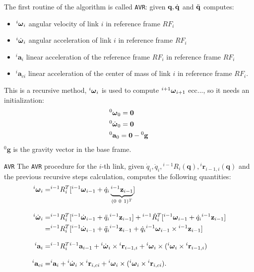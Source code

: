 \documentclass[10pt, a4paper]{report}
\newcommand{\q}{{\mathbf q}}
\begin{document}
\noindent The first routine of the algorithm is called \texttt{AVR}: given $\q,\dq$ and ${\ddot{\mathbf q}}$ computes:\begin{itemize}
    \item ${}^i{\boldsymbol{\omega}}_i$ angular velocity of link $i$ in reference frame $RF_i$
    \item ${}^i\dot{{\boldsymbol{\omega}}}_i$ angular acceleration of link $i$ in reference frame $RF_i$
    \item ${}^i\mathbf a_{i}$ linear acceleration of the  reference frame $RF_i$ in reference frame $RF_i$ 
    \item ${}^i\mathbf a_{ci}$ linear acceleration of the center of mass of link $i$ in reference frame $RF_i$.
\end{itemize}
This is a recursive method, ${}^i{\boldsymbol{\omega}}_i$ is used to compute ${}^{i+1}{\boldsymbol{\omega}}_{i+1}$ ecc..., so it needs an initialization:\begin{align}
    &{}^0{\boldsymbol{\omega}}_0=\mathbf 0\\
    &{}^0\dot{{\boldsymbol{\omega}}}_0=\mathbf 0\\
    &{}^0\mathbf a_{0}=\mathbf 0- {}^0\mathbf g
\end{align}
${}^0\mathbf g$ is the gravity vector in the base frame.
\begin{boxlemma}{\texttt{AVR}}{}
    The \texttt{AVR} procedure for the $i$-th link, given $\dot q_i,\ddot q_i, {}^{i-1}R_i(\q),{}^i\mathbf r_{i-1,i}(\q)$ and the previous recursive steps calculation, computes the following quantities:\begin{align}
        {}^i{\boldsymbol{\omega}}_i=&{}^{i-1}R_i^T[{}^{i-1}{\boldsymbol{\omega}}_{i-1}+\dot q_i \underbrace{{}^{i-1}\mathbf z_{i-1}}_{(0 \ 0 \ 1)^T}]\\[2ex]
        {}^i\dot{{\boldsymbol{\omega}}}_i=&{}^{i-1}R_i^T[
            {}^{i-1}\dot{{\boldsymbol{\omega}}}_{i-1}+\ddot q_i {}^{i-1}\mathbf z_{i-1}
        ]+{}^{i-1}\dot R_i^T[{}^{i-1}{\boldsymbol{\omega}}_{i-1}+\dot q_i {}^{i-1}\mathbf z_{i-1}]\\
        =&{}^{i-1}R_i^T[
            {}^{i-1}\dot{{\boldsymbol{\omega}}}_{i-1}+\ddot q_i {}^{i-1}\mathbf z_{i-1}+\dot q_i {}^{i-1}{\boldsymbol{\omega}}_{i-1}\times {}^{i-1}\mathbf z_{i-1}
        ]\\[2ex]
        {}^i\mathbf a_i=&{}^{i-1}R_i^T {}^{i-1}\mathbf a_{i-1}+{}^i\dot{{\boldsymbol{\omega}}}_i\times {}^i\mathbf r_{i-1,i}+{}^i{\boldsymbol{\omega}}_i\times ({}^i{\boldsymbol{\omega}}_i\times {}^i\mathbf r_{i-1,i})\\[2ex]
        {}^i\mathbf a_{ci}=&{}^i\mathbf a_i+{}^i\dot{{\boldsymbol{\omega}}}_i\times {}^i\mathbf r_{i,ci}+{}^{i}{\boldsymbol{\omega}}_i\times ({}^{i}{\boldsymbol{\omega}}_i\times {}^i\mathbf r_{i,ci}).
    \end{align}
\end{boxlemma}
\end{document}
